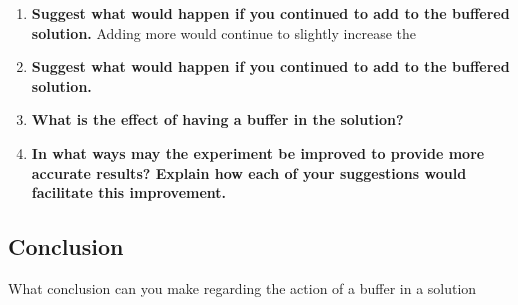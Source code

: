 		\begin{enumerate}
			\item \textbf{Suggest what would happen if you continued to add  to the buffered solution.}
				\subitem Adding more  would continue to slightly increase the 

			\item \textbf{Suggest what would happen if you continued to add  to the buffered solution.}
			\item \textbf{What is the effect of having a buffer in the solution?}
			\item \textbf{In what ways may the experiment be improved to provide more accurate results? Explain how each of your suggestions would facilitate this improvement.}
		\end{enumerate}

	\subsection{Conclusion}
	
		What conclusion can you make regarding the action of a buffer in a solution
